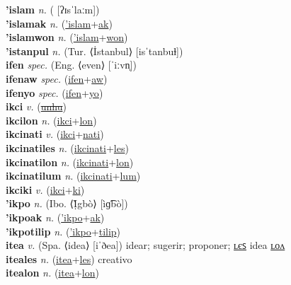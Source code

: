 \textbf{'islam} \textit{n.} ( [ʔɪsˈlaːm])
 \label{'islam} \\
\textbf{'islamak} \textit{n.} (\hyperref['islam]{'islam}+\hyperref[ak]{ak})
 \label{'islamak} \\
\textbf{'islamwon} \textit{n.} (\hyperref['islam]{'islam}+\hyperref[won]{won})
 \label{'islamwon} \\
\textbf{'istanpul} \textit{n.} (Tur. ⟨İstanbul⟩ [isˈtanbuɫ])
 \label{'istanpul} \\
\textbf{ifen} \textit{spec.} (Eng. ⟨even⟩ [ˈiːvn̩])
 \label{ifen} \\
\textbf{ifenaw} \textit{spec.} (\hyperref[ifen]{ifen}+\hyperref[aw]{aw})
 \label{ifenaw} \\
\textbf{ifenyo} \textit{spec.} (\hyperref[ifen]{ifen}+\hyperref[yo]{yo})
 \label{ifenyo} \\
\textbf{ikci} \textit{v.} (\hyperref[unhu]{\sout{unhu}})
 \label{ikci} \\
\textbf{ikcilon} \textit{n.} (\hyperref[ikci]{ikci}+\hyperref[lon]{lon})
 \label{ikcilon} \\
\textbf{ikcinati} \textit{v.} (\hyperref[ikci]{ikci}+\hyperref[nati]{nati})
 \label{ikcinati} \\
\textbf{ikcinatiles} \textit{n.} (\hyperref[ikcinati]{ikcinati}+\hyperref[les]{les})
 \label{ikcinatiles} \\
\textbf{ikcinatilon} \textit{n.} (\hyperref[ikcinati]{ikcinati}+\hyperref[lon]{lon})
 \label{ikcinatilon} \\
\textbf{ikcinatilum} \textit{n.} (\hyperref[ikcinati]{ikcinati}+\hyperref[lum]{lum})
 \label{ikcinatilum} \\
\textbf{ikciki} \textit{v.} (\hyperref[ikci]{ikci}+\hyperref[ki]{ki})
 \label{ikciki} \\
\textbf{'ikpo} \textit{n.} (Ibo. ⟨Ị̀gbò⟩ [ìɡ͡bò])
 \label{'ikpo} \\
\textbf{'ikpoak} \textit{n.} (\hyperref['ikpo]{'ikpo}+\hyperref[ak]{ak})
 \label{'ikpoak} \\
\textbf{'ikpotilip} \textit{n.} (\hyperref['ikpo]{'ikpo}+\hyperref[tilip]{tilip})
 \label{'ikpotilip} \\
\textbf{itea} \textit{v.} (Spa. ⟨idea⟩ [iˈðea])
idear; sugerir; proponer; \hyperref[iteales]{ʟєꜱ} idea \hyperref[itealon]{ʟᴏᴧ} \label{itea} \\
\textbf{iteales} \textit{n.} (\hyperref[itea]{itea}+\hyperref[les]{les})
creativo \label{iteales} \\
\textbf{itealon} \textit{n.} (\hyperref[itea]{itea}+\hyperref[lon]{lon})
